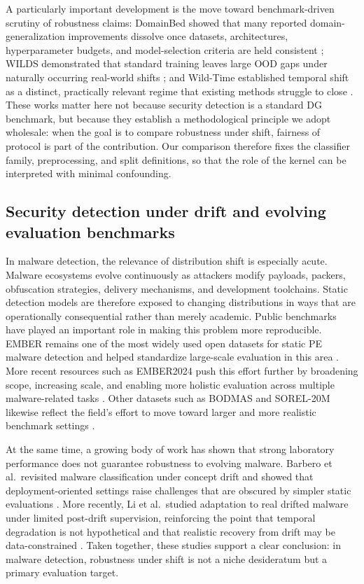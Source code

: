 \documentclass[journal]{IEEEtran}
\begin{document}
A particularly important development is the move toward benchmark-driven scrutiny of robustness claims: DomainBed showed that many reported domain-generalization improvements dissolve once datasets, architectures, hyperparameter budgets, and model-selection criteria are held consistent \cite{gulrajani2021domainbed}; WILDS demonstrated that standard training leaves large OOD gaps under naturally occurring real-world shifts \cite{koh2021wilds}; and Wild-Time established temporal shift as a distinct, practically relevant regime that existing methods struggle to close \cite{yao2022wildtime}. These works matter here not because security detection is a standard DG benchmark, but because they establish a methodological principle we adopt wholesale: when the goal is to compare robustness under shift, fairness of protocol is part of the contribution. Our comparison therefore fixes the classifier family, preprocessing, and split definitions, so that the role of the kernel can be interpreted with minimal confounding.

\subsection{Security detection under drift and evolving evaluation benchmarks}

In malware detection, the relevance of distribution shift is especially acute. Malware ecosystems evolve continuously as attackers modify payloads, packers, obfuscation strategies, delivery mechanisms, and development toolchains. Static detection models are therefore exposed to changing distributions in ways that are operationally consequential rather than merely academic. Public benchmarks have played an important role in making this problem more reproducible. EMBER remains one of the most widely used open datasets for static PE malware detection and helped standardize large-scale evaluation in this area \cite{anderson2018ember}. More recent resources such as EMBER2024 push this effort further by broadening scope, increasing scale, and enabling more holistic evaluation across multiple malware-related tasks \cite{joyce2025ember2024}. Other datasets such as BODMAS and SOREL-20M likewise reflect the field's effort to move toward larger and more realistic benchmark settings \cite{yang2021bodmas,harang2020sorel20m}.

At the same time, a growing body of work has shown that strong laboratory performance does not guarantee robustness to evolving malware. Barbero et al.\ revisited malware classification under concept drift and showed that deployment-oriented settings raise challenges that are obscured by simpler static evaluations \cite{barbero2022transcending}. More recently, Li et al.\ studied adaptation to real drifted malware under limited post-drift supervision, reinforcing the point that temporal degradation is not hypothetical and that realistic recovery from drift may be data-constrained \cite{li2025revisitingdrift}. Taken together, these studies support a clear conclusion: in malware detection, robustness under shift is not a niche desideratum but a primary evaluation target.
\end{document}
